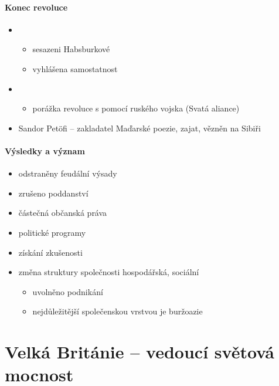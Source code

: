 \paragraph{Konec revoluce}
\begin{itemize}
\item {}
	\begin{itemize}
	\item sesazeni Habsburkové 
	\item vyhlášena samostatnost
	\end{itemize}
\item {}
	\begin{itemize}
	\item porážka revoluce s pomocí ruského vojska (Svatá aliance)
	\end{itemize}
\item Sandor Petöfi -- zakladatel Maďarské poezie, zajat, vězněn na Sibiři
\end{itemize}

\paragraph{Výsledky a význam}
\begin{itemize}
\item odstraněny feudální výsady
\item zrušeno poddanství
\item částečná občanská práva
\item politické programy
\item získání zkušenosti 
\item změna struktury společnosti hospodářská, sociální
	\begin{itemize}
	\item uvolněno podnikání
	\item nejdůležitější společenskou vrstvou je buržoazie
	\end{itemize}
\end{itemize}

\section{Velká Británie -- vedoucí světová mocnost}
